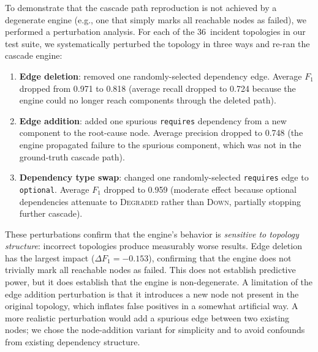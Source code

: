 \documentclass[10pt,twocolumn]{article}
\begin{document}
To demonstrate that the cascade path reproduction is not achieved
by a degenerate engine (e.g., one that simply marks all reachable
nodes as failed), we performed a perturbation analysis. For each
of the 36~incident topologies in our test suite, we systematically
perturbed the topology in three ways and re-ran the cascade engine:

\begin{enumerate}[nosep]
\item \textbf{Edge deletion}: removed one randomly-selected
  dependency edge. Average $F_1$ dropped from 0.971 to 0.818
  (average recall dropped to 0.724 because the engine could no
  longer reach components through the deleted path).
\item \textbf{Edge addition}: added one spurious \texttt{requires}
  dependency from a new component to the root-cause node. Average
  precision dropped to 0.748 (the engine propagated failure to
  the spurious component, which was not in the ground-truth
  cascade path).
\item \textbf{Dependency type swap}: changed one randomly-selected
  \texttt{requires} edge to \texttt{optional}. Average $F_1$
  dropped to 0.959 (moderate effect because optional dependencies
  attenuate to \textsc{Degraded} rather than \textsc{Down},
  partially stopping further cascade).
\end{enumerate}

These perturbations confirm that the engine's behavior is
\emph{sensitive to topology structure}: incorrect topologies
produce measurably worse results. Edge deletion has the largest
impact ($\Delta F_1 = -0.153$), confirming that the engine does
not trivially mark all reachable nodes as failed. This does not
establish predictive power, but it does establish that the engine
is non-degenerate.
A limitation of the edge addition perturbation is that it
introduces a new node not present in the original topology,
which inflates false positives in a somewhat artificial way.
A more realistic perturbation would add a spurious edge between
two existing nodes; we chose the node-addition variant for
simplicity and to avoid confounds from existing dependency
structure.
\end{document}
